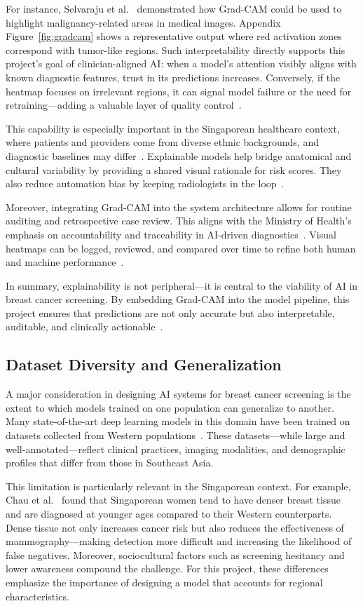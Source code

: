 \documentclass[12pt]{article}
\begin{document}
For instance, Selvaraju et al.~\cite{5} demonstrated how Grad-CAM could be used to highlight malignancy-related areas in medical images. Appendix Figure~\ref{fig:gradcam} shows a representative output where red activation zones correspond with tumor-like regions. Such interpretability directly supports this project’s goal of clinician-aligned AI: when a model’s attention visibly aligns with known diagnostic features, trust in its predictions increases. Conversely, if the heatmap focuses on irrelevant regions, it can signal model failure or the need for retraining—adding a valuable layer of quality control~\cite{5}.

This capability is especially important in the Singaporean healthcare context, where patients and providers come from diverse ethnic backgrounds, and diagnostic baselines may differ~\cite{6}. Explainable models help bridge anatomical and cultural variability by providing a shared visual rationale for risk scores. They also reduce automation bias by keeping radiologists in the loop~\cite{3}.

Moreover, integrating Grad-CAM into the system architecture allows for routine auditing and retrospective case review. This aligns with the Ministry of Health’s emphasis on accountability and traceability in AI-driven diagnostics~\cite{6}. Visual heatmaps can be logged, reviewed, and compared over time to refine both human and machine performance~\cite{5}.

In summary, explainability is not peripheral—it is central to the viability of AI in breast cancer screening. By embedding Grad-CAM into the model pipeline, this project ensures that predictions are not only accurate but also interpretable, auditable, and clinically actionable~\cite{5}.

\subsection{Dataset Diversity and Generalization}

A major consideration in designing AI systems for breast cancer screening is the extent to which models trained on one population can generalize to another. Many state-of-the-art deep learning models in this domain have been trained on datasets collected from Western populations~\cite{1}. These datasets—while large and well-annotated—reflect clinical practices, imaging modalities, and demographic profiles that differ from those in Southeast Asia.

This limitation is particularly relevant in the Singaporean context. For example, Chau et al.~\cite{6} found that Singaporean women tend to have denser breast tissue and are diagnosed at younger ages compared to their Western counterparts. Dense tissue not only increases cancer risk but also reduces the effectiveness of mammography—making detection more difficult and increasing the likelihood of false negatives. Moreover, sociocultural factors such as screening hesitancy and lower awareness compound the challenge. For this project, these differences emphasize the importance of designing a model that accounts for regional characteristics.
\end{document}
